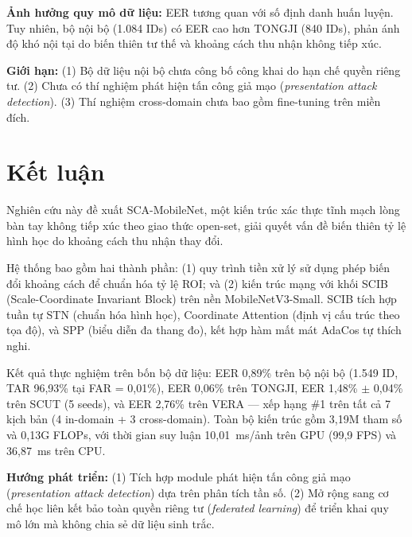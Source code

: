 \documentclass[12pt,a4paper]{article}
\begin{document}
\textbf{Ảnh hưởng quy mô dữ liệu:} EER tương quan với số định danh huấn luyện. Tuy nhiên, bộ nội bộ (1.084 IDs) có EER cao hơn TONGJI (840 IDs), phản ánh độ khó nội tại do biến thiên tư thế và khoảng cách thu nhận không tiếp xúc.

\textbf{Giới hạn:} (1) Bộ dữ liệu nội bộ chưa công bố công khai do hạn chế quyền riêng tư. (2) Chưa có thí nghiệm phát hiện tấn công giả mạo (\textit{presentation attack detection}). (3) Thí nghiệm cross-domain chưa bao gồm fine-tuning trên miền đích.

\section{Kết luận}

Nghiên cứu này đề xuất SCA-MobileNet, một kiến trúc xác thực tĩnh mạch lòng bàn tay không tiếp xúc theo giao thức open-set, giải quyết vấn đề biến thiên tỷ lệ hình học do khoảng cách thu nhận thay đổi.

Hệ thống bao gồm hai thành phần: (1) quy trình tiền xử lý sử dụng phép biến đổi khoảng cách để chuẩn hóa tỷ lệ ROI; và (2) kiến trúc mạng với khối SCIB (Scale-Coordinate Invariant Block) trên nền MobileNetV3-Small. SCIB tích hợp tuần tự STN (chuẩn hóa hình học), Coordinate Attention (định vị cấu trúc theo tọa độ), và SPP (biểu diễn đa thang đo), kết hợp hàm mất mát AdaCos tự thích nghi.

Kết quả thực nghiệm trên bốn bộ dữ liệu: EER 0,89\% trên bộ nội bộ (1.549 ID, TAR 96,93\% tại FAR = 0,01\%), EER 0,06\% trên TONGJI, EER 1,48\% $\pm$ 0,04\% trên SCUT (5 seeds), và EER 2,76\% trên VERA --- xếp hạng \#1 trên tất cả 7 kịch bản (4 in-domain + 3 cross-domain). Toàn bộ kiến trúc gồm 3,19M tham số và 0,13G FLOPs, với thời gian suy luận 10,01~ms/ảnh trên GPU (99,9 FPS) và 36,87~ms trên CPU.

\textbf{Hướng phát triển:} (1) Tích hợp module phát hiện tấn công giả mạo (\textit{presentation attack detection}) dựa trên phân tích tần số. (2) Mở rộng sang cơ chế học liên kết bảo toàn quyền riêng tư (\textit{federated learning}) để triển khai quy mô lớn mà không chia sẻ dữ liệu sinh trắc.
\end{document}
